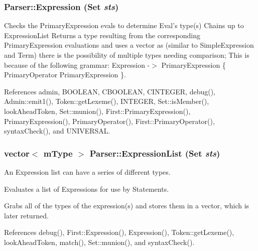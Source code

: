 \hypertarget{classParser_ab441560920f594e80d354c51ce64b77e}{
\subsubsection[{Expression}]{ Parser::Expression ({\bf Set} {\em sts})}}
\label{classParser_ab441560920f594e80d354c51ce64b77e}


Checks the PrimaryExpression evals to determine Eval's type(s) Chains up to ExpressionList Returns a type resulting from the corresponding PrimaryExpression evaluations and uses a vector as (similar to SimpleExpression and Term) there is the possibility of multiple types needing comparison; This is because of the following grammar: Expression -\/$>$ PrimaryExpression \{ PrimaryOperator PrimaryExpression \}. 



References admin, BOOLEAN, CBOOLEAN, CINTEGER, debug(), Admin::emit1(), Token::getLexeme(), INTEGER, Set::isMember(), lookAheadToken, Set::munion(), First::PrimaryExpression(), PrimaryExpression(), PrimaryOperator(), First::PrimaryOperator(), syntaxCheck(), and UNIVERSAL.

\hypertarget{classParser_a5b5064d9a2c559fb1aae1c39d5fe3663}{
\subsubsection[{ExpressionList}]{\setlength{\rightskip}{0pt plus 5cm}vector$<$ {\bf mType} $>$ Parser::ExpressionList ({\bf Set} {\em sts})}}
\label{classParser_a5b5064d9a2c559fb1aae1c39d5fe3663}


An Expression list can have a series of different types. 

Evaluates a list of Expressions for use by Statements.

Grabs all of the types of the expression(s) and stores them in a vector, which is later returned. 

References debug(), First::Expression(), Expression(), Token::getLexeme(), lookAheadToken, match(), Set::munion(), and syntaxCheck().

